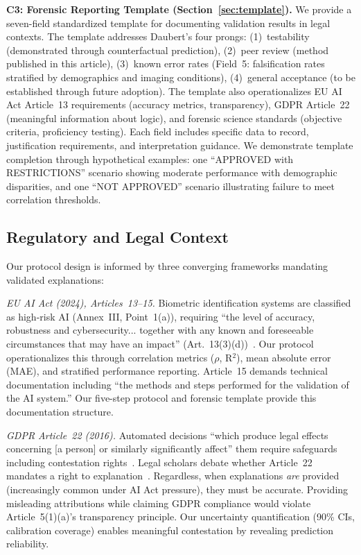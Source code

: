 \textbf{C3: Forensic Reporting Template (Section~\ref{sec:template}).} We provide a seven-field standardized template for documenting validation results in legal contexts. The template addresses Daubert's four prongs: (1)~testability (demonstrated through counterfactual prediction), (2)~peer review (method published in this article), (3)~known error rates (Field~5: falsification rates stratified by demographics and imaging conditions), (4)~general acceptance (to be established through future adoption). The template also operationalizes EU AI Act Article~13 requirements (accuracy metrics, transparency), GDPR Article~22 (meaningful information about logic), and forensic science standards (objective criteria, proficiency testing). Each field includes specific data to record, justification requirements, and interpretation guidance. We demonstrate template completion through hypothetical examples: one ``APPROVED with RESTRICTIONS'' scenario showing moderate performance with demographic disparities, and one ``NOT APPROVED'' scenario illustrating failure to meet correlation thresholds.

\subsection{Regulatory and Legal Context}

Our protocol design is informed by three converging frameworks mandating validated explanations:

\textit{EU AI Act (2024), Articles~13--15.} Biometric identification systems are classified as high-risk AI (Annex~III, Point~1(a)), requiring ``the level of accuracy, robustness and cybersecurity... together with any known and foreseeable circumstances that may have an impact'' (Art.~13(3)(d))~\cite{euaiact2024}. Our protocol operationalizes this through correlation metrics ($\rho$, R$^2$), mean absolute error (MAE), and stratified performance reporting. Article~15 demands technical documentation including ``the methods and steps performed for the validation of the AI system.'' Our five-step protocol and forensic template provide this documentation structure.

\textit{GDPR Article~22 (2016).} Automated decisions ``which produce legal effects concerning [a person] or similarly significantly affect'' them require safeguards including contestation rights~\cite{gdpr2016}. Legal scholars debate whether Article~22 mandates a right to explanation~\cite{wachter2017right,selbst2017meaningful}. Regardless, when explanations \textit{are} provided (increasingly common under AI Act pressure), they must be accurate. Providing misleading attributions while claiming GDPR compliance would violate Article~5(1)(a)'s transparency principle. Our uncertainty quantification (90\% CIs, calibration coverage) enables meaningful contestation by revealing prediction reliability.

